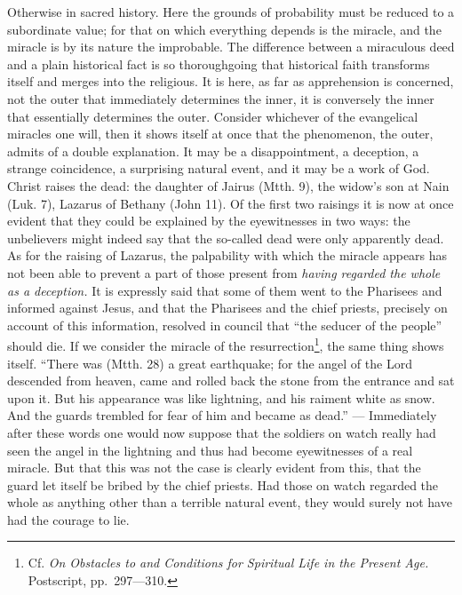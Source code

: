 \documentclass[12pt,a4paper,openany]{book}
\newcommand{\opage}[1]{\marginnote{\footnotesize\textit{[#1]}}}
\begin{document}
Otherwise in sacred history. Here the grounds of probability must
be reduced to a subordinate value;
for that on which everything depends is the miracle, and the miracle
is by its nature the improbable. The difference
between a miraculous deed and a plain historical fact
is so thoroughgoing that historical faith
transforms itself and merges into the religious. It is here,
as far as apprehension is concerned, not the outer that immediately
determines the inner, it is conversely the inner
that essentially determines the outer. Consider whichever
of the evangelical miracles one will, then it shows itself
at once that the phenomenon, the outer, admits of a double
\setcounter{footnote}{0}%
\opage{316}explanation.
It may be a disappointment, a deception, a strange
coincidence, a surprising natural event,
and it may be a work of God. Christ raises
the dead: the daughter of Jairus (Mtth. 9), the widow's son at Nain
(Luk. 7), Lazarus of Bethany (John 11). Of the first two
raisings it is now at once evident that they could be explained by the
eyewitnesses in two ways: the unbelievers
might indeed say that the so-called dead were only
apparently dead. As for the raising of Lazarus, the
palpability with which the miracle appears has not
been able to prevent a part of those present
from \emph{having regarded the whole as a deception.} It is expressly said
that some of them went to the Pharisees and
informed against Jesus, and that the Pharisees and the chief priests, precisely
on account of this information, resolved in council that
``the seducer of the people'' should die. If we consider the miracle
of the resurrection\footnote[1]{Cf. \emph{On Obstacles to and Conditions for Spiritual Life in the Present Age.} Postscript, pp.\ 297—310.}, the same thing shows itself. ``There was
(Mtth. 28) a great earthquake; for the angel of the Lord descended
from heaven, came and rolled back the stone from
the entrance and sat upon it. But his appearance was
like lightning, and his raiment white as snow. And
the guards trembled for fear of him and became as
dead.'' --- Immediately after these words one would now suppose
that the soldiers on watch really had seen
the angel in the lightning and thus had become eyewitnesses of
a real miracle. But that this was not the case
is clearly evident from this, that the guard let itself be bribed
by the chief priests. Had those on watch
\setcounter{footnote}{0}%
\opage{317}regarded the whole as anything other than a terrible natural event,
they would surely not have had the courage to lie.
\end{document}
